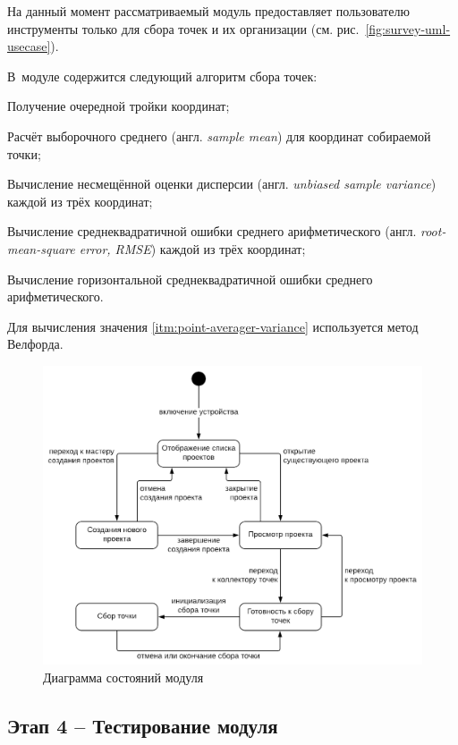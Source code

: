 \documentclass[pta]{../../../../scs-iam}
\begin{document}
На данный момент рассматриваемый модуль предоставляет пользователю инструменты только для сбора точек и их организации (см. рис.~\ref{fig:survey-uml-usecase}).

В~модуле содержится следующий алгоритм сбора точек:
\begin{alphitemize}
  \item Получение очередной тройки координат;
  \item Расчёт выборочного среднего (англ. \emph{sample mean}) для координат собираемой точки;
  \item \label{itm:point-averager-variance} Вычисление несмещённой оценки дисперсии (англ. \emph{unbiased sample variance}) каждой из трёх координат;
  \item Вычисление среднеквадратичной ошибки среднего арифметического (англ. \emph{root-mean-square error, RMSE}) каждой из трёх координат;
  \item Вычисление горизонтальной среднеквадратичной ошибки среднего арифметического.
\end{alphitemize}

Для вычисления значения \ref{itm:point-averager-variance} используется метод Велфорда.

\begin{figure}[hb!]
  \centering
  \setlength{\fboxsep}{5pt}
  \includegraphics[width=.8\textwidth]{../../../../img/uml/survey_state}
  \caption{Диаграмма состояний модуля}
  \label{fig:survey-uml-state}
\end{figure}

\subsection{Этап 4 -- Тестирование модуля}
\end{document}
